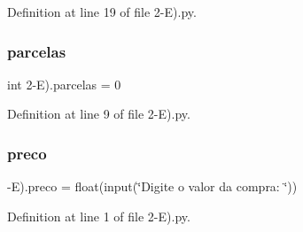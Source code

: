 Definition at line 19 of file 2-\/\+E).\+py.

\mbox{\label{namespace2-_e_08_ad1048efbdd5ee7956984a248965dfac4}} 
\subsubsection{parcelas}
{\footnotesize\ttfamily int 2-\/E).parcelas = 0}



Definition at line 9 of file 2-\/\+E).\+py.

\mbox{\label{namespace2-_e_08_afaec04aaef1d99eeeb427e3cd9852de2}} 
\subsubsection{preco}
{\footnotesize{}-\/E).preco = float(input(\char`\"{}Digite o valor da compra\+: \char`\"{}))}



Definition at line 1 of file 2-\/\+E).\+py.

